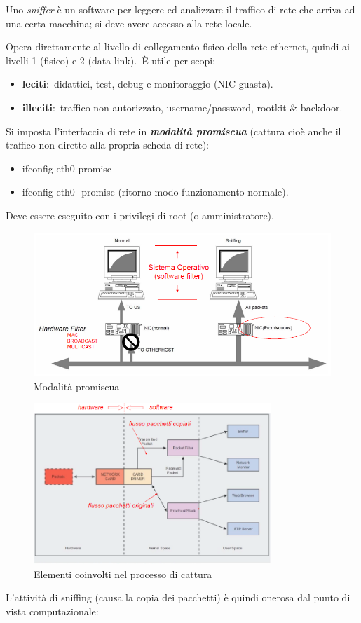 Uno \emph{sniffer} è un software per leggere ed analizzare il traffico di rete che arriva ad una certa macchina; si deve avere accesso alla rete locale.

Opera direttamente al livello di collegamento fisico della rete ethernet, quindi ai livelli 1 (fisico) e 2 (data link).\
È utile per scopi:
\begin{itemize}
    \item \textbf{leciti}:\ didattici, test, debug e monitoraggio (NIC guasta).
    \item \textbf{illeciti}:\ traffico non autorizzato, username/password, rootkit \& backdoor.
\end{itemize}
Si imposta l’interfaccia di rete in \textbf{\emph{modalità promiscua}} (cattura cioè anche il traffico non diretto alla propria scheda di rete):
\begin{itemize}
    \item ifconfig eth0 promisc
    \item ifconfig eth0 -promisc (ritorno modo funzionamento normale).
\end{itemize}
Deve essere eseguito con i privilegi di root (o amministratore).

\begin{figure}[H]
    \centering
    \includegraphics[width=\textwidth]{immagini/Promiscuous_mode.png}
    \caption*{Modalità promiscua}
\end{figure}

\begin{figure}[H]
    \centering
    \includegraphics[width=0.8\textwidth]{immagini/Capture_process.png}
    \caption*{Elementi coinvolti nel processo di cattura}
\end{figure}
L’attività di sniffing (causa la copia dei pacchetti) è quindi onerosa dal punto di vista computazionale:

